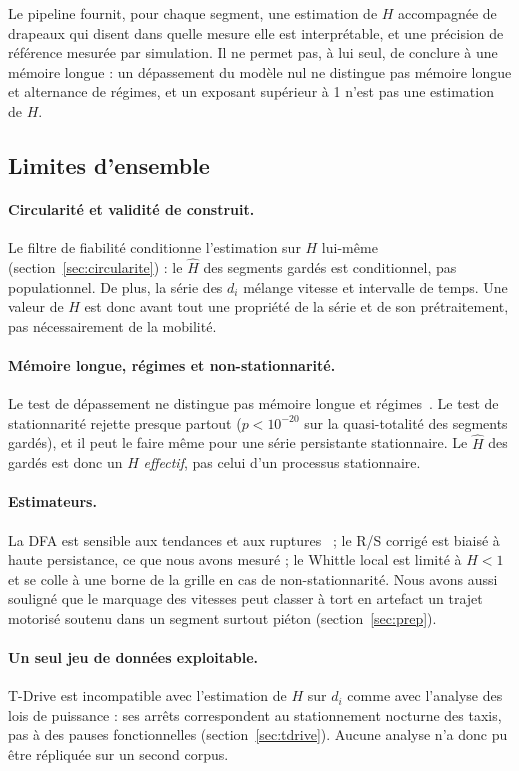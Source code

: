 \documentclass[11pt,a4paper]{article}
\renewcommand{\_}{\textunderscore\penalty0\hspace{0pt}}
\begin{document}
Le pipeline fournit, pour chaque segment, une estimation de $H$ accompagnée de drapeaux qui
disent dans quelle mesure elle est interprétable, et une précision de référence mesurée par
simulation. Il ne permet pas, à lui seul, de conclure à une mémoire longue : un dépassement
du modèle nul ne distingue pas mémoire longue et alternance de régimes, et un exposant
supérieur à 1 n'est pas une estimation de $H$.

\subsection{Limites d'ensemble}
\label{sec:limites}

\paragraph{Circularité et validité de construit.} Le filtre de fiabilité conditionne
l'estimation sur $H$ lui-même (section~\ref{sec:circularite}) : le $\hat H$ des segments
gardés est conditionnel, pas populationnel. De plus, la série des $d_i$ mélange vitesse et
intervalle de temps. Une valeur de $H$ est donc avant tout une propriété de la série et de
son prétraitement, pas nécessairement de la mobilité.

\paragraph{Mémoire longue, régimes et non-stationnarité.} Le test de dépassement ne distingue
pas mémoire longue et régimes~\cite{diebold2001}. Le test de stationnarité rejette presque
partout ($p<10^{-20}$ sur la quasi-totalité des segments gardés), et il peut le faire
même pour une série persistante stationnaire. Le $\hat H$ des gardés est donc un $H$
\emph{effectif}, pas celui d'un processus stationnaire.

\paragraph{Estimateurs.} La DFA est sensible aux tendances et aux ruptures~\cite{chen2002} ;
le R/S corrigé est biaisé à haute persistance, ce que nous avons mesuré ; le Whittle local
est limité à $H<1$ et se colle à une borne de la grille en cas de non-stationnarité.
Nous avons aussi souligné que le marquage des vitesses peut classer à tort en artefact un
trajet motorisé soutenu dans un segment surtout piéton (section~\ref{sec:prep}).

\paragraph{Un seul jeu de données exploitable.} T-Drive est incompatible avec l'estimation
de $H$ sur $d_i$ comme avec l'analyse des lois de puissance : ses arrêts correspondent au
stationnement nocturne des taxis, pas à des pauses fonctionnelles (section~\ref{sec:tdrive}).
Aucune analyse n'a donc pu être répliquée sur un second corpus.
\end{document}
